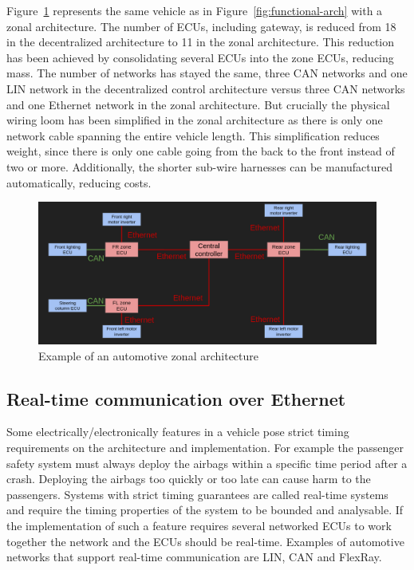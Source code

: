 Figure~\ref{fig:zonal-arch} represents the same vehicle as in Figure~\ref{fig:functional-arch} with a zonal architecture. The number of ECUs, including gateway, is reduced from 18 in the decentralized architecture to 11 in the zonal architecture. This reduction has been achieved by consolidating several ECUs into the zone ECUs, reducing mass. The number of networks has stayed the same, three CAN networks and one LIN network in the decentralized control architecture versus three CAN networks and one Ethernet network in the zonal architecture. But crucially the physical wiring loom has been simplified in the zonal architecture as there is only one network cable spanning the entire vehicle length. This simplification reduces weight, since there is only one cable going from the back to the front instead of two or more. Additionally, the shorter sub-wire harnesses can be manufactured automatically, reducing costs.

\begin{figure}[htb]
    \centering
    \includegraphics[width=\textwidth]{images/zone-arch.png}
    \caption{Example of an automotive zonal architecture}
    \label{fig:zonal-arch}
\end{figure}

\subsection{Real-time communication over Ethernet}
Some electrically/electronically features in a vehicle pose strict timing requirements on the architecture and implementation. For example the passenger safety system must always deploy the airbags within a specific time period after a crash. Deploying the airbags too quickly or too late can cause harm to the passengers. Systems with strict timing guarantees are called real-time systems and require the timing properties of the system to be bounded and analysable. If the implementation of such a feature requires several networked ECUs to work together the network and the ECUs should be real-time. Examples of automotive networks that support real-time communication are LIN, CAN and FlexRay. 


